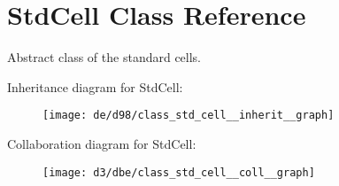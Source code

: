 \hypertarget{class_std_cell}{}\section{Std\+Cell Class Reference}
\label{class_std_cell}


Abstract class of the standard cells.  




Inheritance diagram for Std\+Cell\+:
\nopagebreak
\begin{figure}[H]
\begin{center}
\leavevmode
\texttt{[image: de/d98/class\_std\_cell\_\_inherit\_\_graph]}
\end{center}
\end{figure}


Collaboration diagram for Std\+Cell\+:
\nopagebreak
\begin{figure}[H]
\begin{center}
\leavevmode
\texttt{[image: d3/dbe/class\_std\_cell\_\_coll\_\_graph]}
\end{center}
\end{figure}
